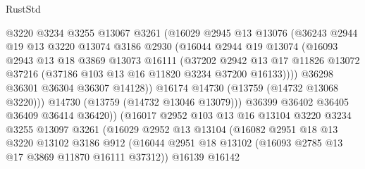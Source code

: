 \begin{lexlean}{RustStd}
\begin{coremodule}
                        @3220
                        @3234
                        @3255
                        @13067
                        @3261
                        (@16029
                          @2945
                          @13
                          @13076
                          (@36243
                            @2944
                            @19
                            @13
                            @3220
                            @13074
                            @3186
                            @2930
                            (@16044
                              @2944
                              @19
                              @13074
                              (@16093
                                @2943
                                @13
                                @18
                                @3869
                                @13073
                                @16111
                                (@37202
                                  @2942
                                  @13
                                  @17
                                  @11826
                                  @13072
                                  @37216
                                  (@37186 @103 @13 @16 @11820 @3234 @37200 @16133))))
                            @36298
                            @36301
                            @36304
                            @36307
                            @14128))
                        @16174
                        @14730
                        (@13759 (@14732 @13068 @3220)))
                      @14730
                      (@13759 (@14732 @13046 @13079)))
                    @36399
                    @36402
                    @36405
                    @36409
                    @36414
                    @36420))
                (@16017
                  @2952
                  @103
                  @13
                  @16
                  @13104
                  @3220
                  @3234
                  @3255
                  @13097
                  @3261
                  (@16029
                    @2952
                    @13
                    @13104
                    (@16082
                      @2951
                      @18
                      @13
                      @3220
                      @13102
                      @3186
                      @912
                      (@16044 @2951 @18 @13102 (@16093 @2785 @13 @17 @3869 @11870 @16111 @37312))
                      @16139
                      @16142

\end{coremodule}
\end{lexlean}
